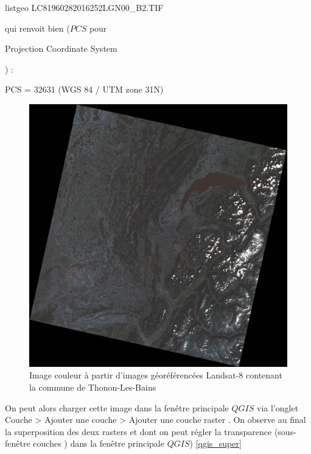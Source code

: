 \documentclass{book}
\begin{document}
\begin{center}
listgeo LC81960282016252LGN00\_B2.TIF
\end{center}

qui renvoit bien ($PCS$ pour \begin{itshape}Projection Coordinate System\end{itshape}) :\\

\begin{center}
PCS = 32631 (WGS 84 / UTM zone 31N)\\
\end{center}

\clearpage

\begin{figure}[H]
\begin{center}
\includegraphics[scale=0.4]{images/georeferencing/Thonon_landsat.png}
\end{center}
\caption{Image couleur à partir d'images géoréférencées Landsat-8 contenant la commune de Thonon-Les-Bains}
\label{Thonon-landsat}
\end{figure}

On peut alors charger cette image dans la fenêtre principale $QGIS$ via l'onglet \og Couche > Ajouter une couche > Ajouter une couche 
raster \fg{}. On observe au final la superposition des deux rasters et dont on peut régler la transparence (sous-fen\^{e}tre \og couches \fg{}) 
dans la fen\^{e}tre principale $QGIS$) \ref{qgis_super}
\end{document}
